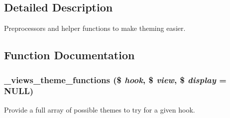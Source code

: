 \subsection{Detailed Description}
Preprocessors and helper functions to make theming easier. 

\subsection{Function Documentation}
\hypertarget{profiles_2dosomething_2modules_2contrib_2views_2theme_2theme_8inc_acf9e7bcb84ebc378f901f483143d0ff0}{
\subsubsection[{\_\-views\_\-theme\_\-functions}]{\setlength{\rightskip}{0pt plus 5cm}\_\-views\_\-theme\_\-functions (\$ {\em hook}, \/  \$ {\em view}, \/  \$ {\em display} = {\ttfamily NULL})}}
\label{profiles_2dosomething_2modules_2contrib_2views_2theme_2theme_8inc_acf9e7bcb84ebc378f901f483143d0ff0}
Provide a full array of possible themes to try for a given hook.


